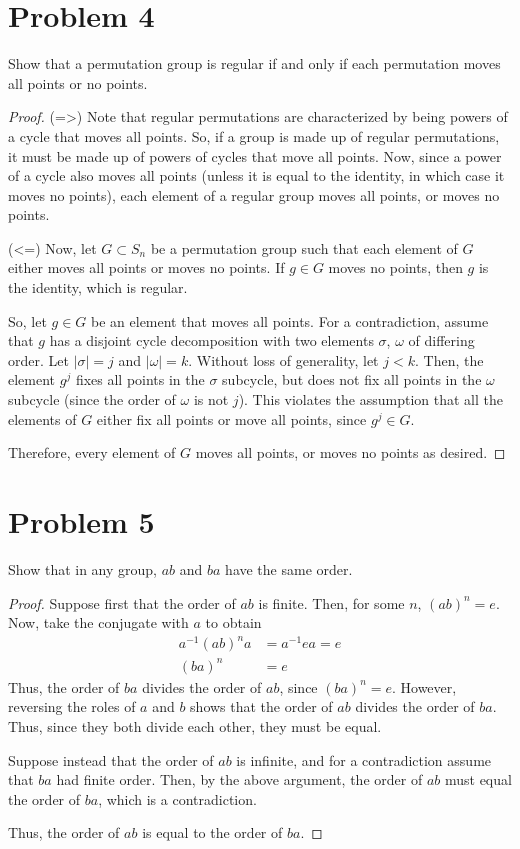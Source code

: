 \documentclass[paper=a4, fontsize=11pt]{scrartcl} %
\numberwithin{equation}{section} %
\numberwithin{figure}{section} %
\numberwithin{table}{section} %
\begin{document}
\section*{Problem 4}
Show that a permutation group is regular if and only if each permutation
moves all points or no points.
\\
\begin{proof}
(=>) Note that regular permutations are characterized by being powers of a cycle
that moves all points. So, if a group is made up of regular permutations, it
must be made up of powers of cycles that move all points. Now, since a power of
a cycle also moves all points (unless it is equal to the identity, in which case
it moves no points), each element of a regular group moves all points, or moves no
points.

(<=)
Now, let $G\subset S_n$ be a permutation group such that each element of $G$ either moves
all points or moves no points. If $g\in G$ moves no points, then $g$ is the identity,
which is regular.

So, let $g\in G$ be an element that moves all points. For a contradiction, assume
that $g$ has a disjoint cycle decomposition with two elements $\sigma$, $\omega$ 
of differing order. Let $|\sigma| = j$ and $|\omega| = k$. Without loss of generality,
let $j<k$. Then, the element $g^j$ fixes all points in the $\sigma$ subcycle, but does
not fix all points in the $\omega$ subcycle (since the order of $\omega$ is not $j$).
This violates the assumption that all the elements of $G$ either fix all points or move
all points, since $g^j\in G$.

Therefore, every element of $G$ moves all points, or moves no points as desired.

\end{proof}

\section*{Problem 5}
Show that in any group, $ab$ and $ba$ have the same order.
\\
\begin{proof}
Suppose first that the order of $ab$ is finite. Then, for some $n$, $(ab)^n = e$.
Now, take the conjugate with $a$ to obtain
\[
\begin{aligned}
a^{-1}(ab)^na &= a^{-1}ea = e\\
(ba)^n &= e
\end{aligned}
\]
Thus, the order of $ba$ divides the order of $ab$, since $(ba)^n=e$.
However, reversing the roles of $a$ and $b$ shows that the order of $ab$ divides the
order of $ba$. Thus, since they both divide each other, they must be equal.

Suppose instead that the order of $ab$ is infinite, and for a contradiction assume that
$ba$ had finite order. Then, by the above argument, the order of $ab$ must equal the order
of $ba$, which is a contradiction.

Thus, the order of $ab$ is equal to the order of $ba$.
\end{proof}
\end{document}
